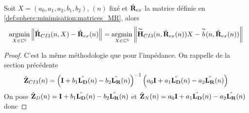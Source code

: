     \begin{prop}
      Soit \(X = (a_0,a_1,a_2,b_1,b_2)\), \((n)\) fixé et \(\hat{\mathbf{R}}_{ex}\) la matrice définie en \ref{def:sphere:minimisation:matrices_MR}, alors
      \begin{align*}
        {\underset{X\in\mathbb C^5}{\operatorname{argmin}}} \left\lVert\hat{\mathbf{R}}_{CI3}(n,X) - \hat{\mathbf{R}}_{ex}(n)\right\rVert =
        {\underset{X\in\mathbb C^5}{\operatorname{argmin}}} \left\lVert\overset{\thicksim}{\mathbf{H}}_{CI3}(n,\hat{\mathbf{R}}_{ex}(n))X - \overset{\thicksim}{b}(n,\hat{\mathbf{R}}_{ex}(n))\right\rVert
      \end{align*}
    \end{prop}

    \begin{proof}
      C'est la même méthodologie que pour l'impédance.
      On rappelle de la section précédente
      \begin{align*}
        \hat{\mathbf{Z}}_{CI3}(n) = \left(\mathbf{I} + b_1 \hat{\mathbf{L_D}}(n) - b_2 \hat{\mathbf{L_R}}(n) \right)^{-1}
        \left(a_0 \mathbf{I} + a_1 {\hat{\mathbf{L_D}}(n)} - a_2 {\hat{\mathbf{L_R}}(n)}\right)
      \end{align*}
      On pose \(\hat{\mathbf{Z}}_D(n) = \mathbf{I} + b_1 \hat{\mathbf{L_D}}(n) - b_2 \hat{\mathbf{L_R}}(n)\) et \(\hat{\mathbf{Z}}_N(n) = a_0 \mathbf{I} + a_1 {\hat{\mathbf{L_D}}(n)} - a_2 {\hat{\mathbf{L_R}}(n)}\) donc


\end{proof}
